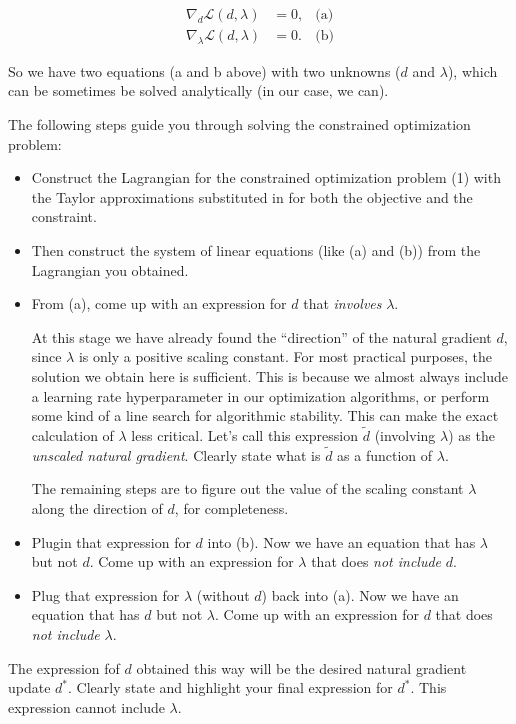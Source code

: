 \begin{align*}
 \nabla_d \mathcal{L}(d,\lambda) &= 0, &\text{(a)} \\
 \nabla_\lambda \mathcal{L}(d,\lambda) &= 0. &\text{(b)}
\end{align*}

So we have two equations (a and b above) with two unknowns ($d$ and $\lambda$), which can be sometimes be solved analytically (in our case, we can).

The following steps guide you through solving the constrained optimization problem:

\begin{itemize}
\item 
Construct the Lagrangian for the constrained optimization problem (1) with the Taylor approximations substituted in for both the objective and the constraint.



\item 
Then construct the system of linear equations (like (a) and (b)) from the Lagrangian you obtained.


\item

From (a), come up with an expression for $d$ that \emph{involves} $\lambda$.


At this stage we have already found the ``direction'' of the natural gradient $d$, since $\lambda$ is only a positive scaling constant. For most practical purposes, the solution we obtain here is sufficient. This is because we almost always include a learning rate hyperparameter in our optimization algorithms, or perform some kind of a line search for algorithmic stability. This can make the exact calculation of $\lambda$ less critical. Let's call this expression $\tilde{d}$ (involving $\lambda$) as the \emph{unscaled natural gradient}. Clearly state what is $\tilde{d}$ as a function of $\lambda$.


The remaining steps are to figure out the value of the scaling constant $\lambda$ along the direction of $d$, for completeness.

\item 

Plugin that expression for $d$ into (b). Now we have an equation that has $\lambda$ but not $d$. Come up with an expression for $\lambda$ that does \emph{not include} $d$.

\item

Plug that expression for $\lambda$ (without $d$) back into (a). Now we have an equation that has $d$ but not $\lambda$. Come up with an expression for $d$ that does \emph{not include} $\lambda$.

\end{itemize}


The expression fof $d$ obtained this way will be the desired natural gradient update $d^*$. Clearly state and highlight your final expression for $d^*$. This expression cannot include $\lambda$.

\ifnum{} {
  
} \fi
